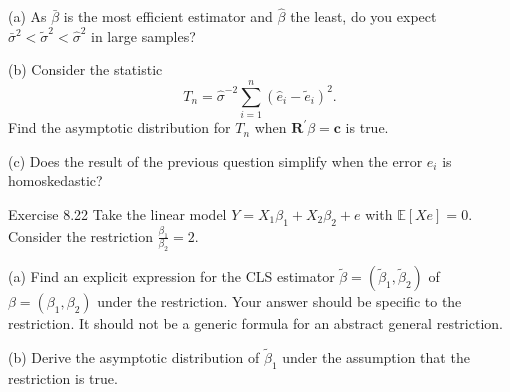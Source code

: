 \documentclass[10pt]{article}
\begin{document}
(a) As $\bar{\beta}$ is the most efficient estimator and $\widehat{\beta}$ the least, do you expect $\bar{\sigma}^{2}<\widetilde{\sigma}^{2}<\widehat{\sigma}^{2}$ in large samples?

(b) Consider the statistic
$$
T_{n}=\widehat{\sigma}^{-2} \sum_{i=1}^{n}\left(\widehat{e}_{i}-\widetilde{e}_{i}\right)^{2} .
$$
Find the asymptotic distribution for $T_{n}$ when $\boldsymbol{R}^{\prime} \beta=\boldsymbol{c}$ is true.

(c) Does the result of the previous question simplify when the error $e_{i}$ is homoskedastic?

Exercise 8.22 Take the linear model $Y=X_{1} \beta_{1}+X_{2} \beta_{2}+e$ with $\mathbb{E}[X e]=0$. Consider the restriction $\frac{\beta_{1}}{\beta_{2}}=2$.

(a) Find an explicit expression for the CLS estimator $\widetilde{\beta}=\left(\widetilde{\beta}_{1}, \widetilde{\beta}_{2}\right)$ of $\beta=\left(\beta_{1}, \beta_{2}\right)$ under the restriction. Your answer should be specific to the restriction. It should not be a generic formula for an abstract general restriction.

(b) Derive the asymptotic distribution of $\widetilde{\beta}_{1}$ under the assumption that the restriction is true.
\end{document}
